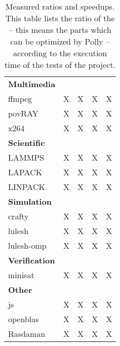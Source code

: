 \begin{table}[!h]
{\begin{minipage}{\textwidth}
\begin{tabularx}{\textwidth}{Xcccc}
                \textbf{Multimedia}\\
                ffmpeg & X & X & X & X\\
                povRAY & X & X & X & X\\
                x264 & X & X & X & X\\
                \midrule
                \textbf{Scientific}\\
                LAMMPS & X & X & X & X\\
                LAPACK & X & X & X & X\\
                LINPACK & X & X & X & X\\
                \midrule
                \textbf{Simulation}\\
                crafty & X & X & X & X\\
                lulesh & X & X & X & X\\
                lulesh-omp & X & X & X & X\\

                \midrule
                \textbf{Verification}\\
                minisat & X & X & X & X\\
                \midrule
                \textbf{Other}\\
                js & X & X & X & X\\
                openblas & X & X & X & X\\
                Rasdaman & X & X & X & X\\
                \bottomrule
            \end{tabularx}
            \caption[Measured ratios and speedups]{
                Measured ratios and speedups.
                This table lists the ratio of the \scops -- this means the parts which can be optimized by Polly -- according to the execution time of the tests of the project.
            }
            \label{tab:ratiosAndSpeedups}
        \end{minipage}
    }
\end{table}
